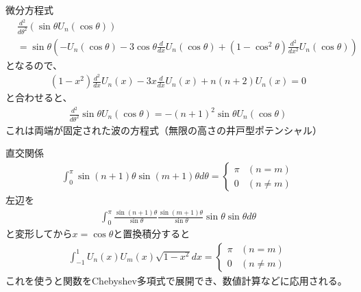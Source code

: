 \documentclass[dvipdfmx]{beamer}
\begin{document}
\begin{frame}{微分方程式}
\begin{align*}
&\frac{d^2}{d\theta^2}(\sin\theta U_n(\cos\theta))\\
&=\sin\theta(-U_n(\cos\theta)-3\cos\theta\frac{d}{dx}U_n(\cos\theta)+(1-\cos^2\theta)\frac{d^2}{dx^2}U_n(\cos\theta))
\end{align*}
となるので、
\begin{align*}
(1-x^2)\frac{d^2}{dx}U_n(x)-3x\frac{d}{dx}U_n(x)+n(n+2)U_n(x)=0
\end{align*}
と合わせると、
\begin{align*}
\frac{d^2}{d\theta^2}\sin\theta U_n(\cos\theta)=-(n+1)^2\sin\theta U_n(\cos\theta)
\end{align*}
これは両端が固定された波の方程式（無限の高さの井戸型ポテンシャル）
\end{frame}

\begin{frame}{直交関係}
\begin{align*}
\int_0^\pi\sin (n+1)\theta\sin (m+1)\theta d\theta=\begin{cases}\pi&(n=m)\\0&(n\neq m)\end{cases}
\end{align*}
左辺を
\begin{align*}
\int_0^\pi\frac{\sin (n+1)\theta}{\sin\theta}\frac{\sin (m+1)\theta}{\sin\theta}\sin\theta \sin\theta d\theta
\end{align*}
と変形してから$x=\cos\theta$と置換積分すると
\begin{align*}
\int^1_{-1}U_n(x)U_m(x)\sqrt{1-x^2}dx=\begin{cases}\pi&(n=m)\\0&(n\neq m)\end{cases}
\end{align*}
これを使うと関数をChebyshev多項式で展開でき、数値計算などに応用される。
\end{frame}
\end{document}
